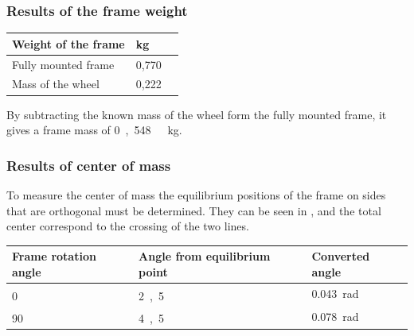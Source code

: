 \subsubsection{Results of the frame weight}
\begin{table}[H]
	\centering
	\begin{tabular}{|l|l|p{4.3cm}|}
		\hline%
		\textbf{Weight of the frame}       &  \textbf{kg}         \\
		\hline%
		Fully mounted frame        	  & 0,770          \\
		\hline%
		Mass of the wheel        	  & 0,222          \\
		\hline%
	\end{tabular}
\end{table}	
By subtracting the known mass of the wheel form the fully mounted frame, it gives a frame mass of \si{0,548\ kg}.

\subsubsection{Results of center of mass}
To measure the center of mass the equilibrium positions of the frame on sides that are orthogonal must be determined. They can be seen in , and the total center correspond to the crossing of the two lines.
\begin{table}[H]
	\begin{tabular}{|l|l|p{5cm}|}
		\hline%
		\textbf{Frame rotation angle}       &  \textbf{Angle from equilibrium point}       &  \textbf{Converted angle} \\
		\hline%
		\si{0^{\circ}}       & \si{2,5^{\circ}}      & \SI{0,043}{rad}     \\
		\hline%
		\si{90^{\circ}} 	 & \si{4,5^{\circ}}   & \SI{0,078}{rad}   \\
		\hline%
	\end{tabular}
\end{table}

